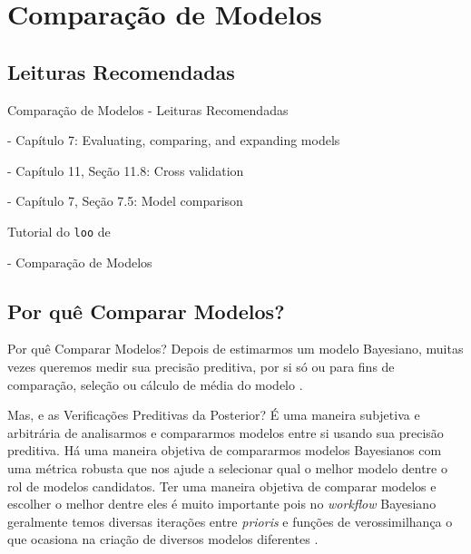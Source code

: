\section{Comparação de Modelos}

\subsection{Leituras Recomendadas}
\begin{frame}{Comparação de Modelos - Leituras Recomendadas}
	\begin{vfilleditems}
		\item \textcite{gelman2013bayesian} - Capítulo 7: Evaluating, comparing, and expanding models
		\item \textcite{gelman2020regression} - Capítulo 11, Seção 11.8: Cross validation
		\item \textcite{mcelreath2020statistical} - Capítulo 7, Seção 7.5: Model comparison
		\item \textcite{vehtariPracticalBayesianModel2015}
		\item Tutorial do \texttt{loo} de \textcite{loo}
		\item \textcite{storopoli2021estatisticabayesianaR} - Comparação de Modelos
		\item \textcite{spiegelhalter2002bayesian}
		\item \textcite{van2005dic}
		\item \textcite{watanabe2010asymptotic}
		\item \textcite{gelfand1996model}
		\item \textcite{watanabe2010asymptotic}
		\item \textcite{geisser1979predictive}
	\end{vfilleditems}
\end{frame}

\subsection{Por quê Comparar Modelos?}
\begin{frame}{Por quê Comparar Modelos?}
	Depois de estimarmos um modelo Bayesiano,
	muitas vezes queremos medir sua precisão preditiva, por si só ou para
	fins de comparação, seleção ou cálculo de média do modelo \parencite{geisser1979predictive}.
\end{frame}

\begin{frame}{Mas, e as Verificações Preditivas da Posterior?}
	É uma maneira subjetiva e arbitrária de analisarmos e compararmos modelos
	entre si usando sua precisão preditiva.
	\vfill
	Há uma maneira objetiva de compararmos modelos Bayesianos com uma
	métrica robusta que nos ajude a selecionar qual o melhor modelo dentre o rol
	de modelos candidatos.
	\vfill
	Ter uma maneira objetiva de comparar modelos e escolher o melhor dentre eles
	é muito importante pois no \textit{workflow} Bayesiano geralmente temos diversas
	iterações entre \textit{prioris} e funções de verossimilhança o que ocasiona na
	criação de diversos modelos diferentes \parencite{gelmanBayesianWorkflow2020}.
\end{frame}

